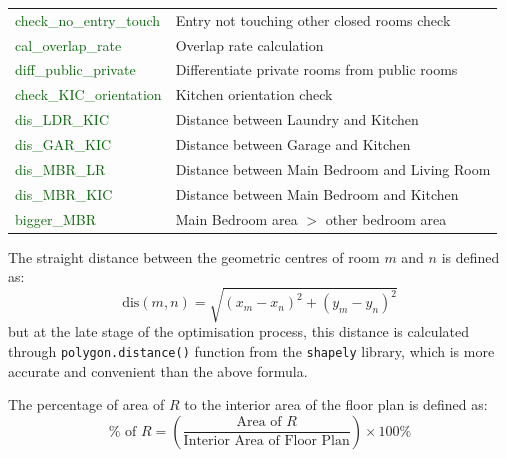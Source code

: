 \documentclass[]{article}
\begin{document}
\begin{table}[h]
\begin{tabularx}{\textwidth}{l l}
        \textcolor{darkgreen}{check\_no\_entry\_touch} & Entry not touching other closed rooms check    \\
        \textcolor{darkgreen}{cal\_overlap\_rate}      & Overlap rate calculation                       \\
        \textcolor{darkgreen}{diff\_public\_private}   & Differentiate private rooms from public rooms  \\
        \textcolor{darkgreen}{check\_KIC\_orientation} & Kitchen orientation check                      \\
        \textcolor{darkgreen}{dis\_LDR\_KIC}           & Distance between Laundry and Kitchen           \\
        \textcolor{darkgreen}{dis\_GAR\_KIC}           & Distance between Garage and Kitchen            \\
        \textcolor{darkgreen}{dis\_MBR\_LR}            & Distance between Main Bedroom and Living Room  \\
        \textcolor{darkgreen}{dis\_MBR\_KIC}           & Distance between Main Bedroom and Kitchen      \\
        \textcolor{darkgreen}{bigger\_MBR}             & Main Bedroom area $>$ other bedroom area       \\
        \hline
    \end{tabularx}
\end{table}

The straight distance between the geometric centres of room $m$ and $n$ is defined as:
\begin{equation*}
    \text{dis}(m, n) = \sqrt{(x_m - x_n)^2 + (y_m - y_n)^2}
\end{equation*}
but at the late stage of the optimisation process, this distance is calculated through \texttt{polygon.distance()} function from the \texttt{shapely} library, which is more accurate and convenient than the above formula.

The percentage of area of $R$ to the interior area of the floor plan is defined as:
\begin{equation*}
    \% \text{ of } R = \left( \frac{\text{Area of } R}{\text{Interior Area of Floor Plan}} \right) \times 100\%
\end{equation*}
\end{document}
